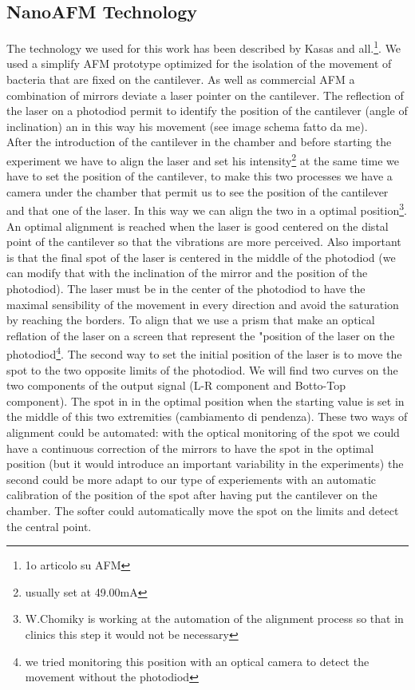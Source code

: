 \documentclass[11pt, a4paper]{article}
\begin{document}
\subsection{NanoAFM Technology}%
The technology we used for this work has been described by Kasas and all.\footnote{1o articolo su AFM}. We used a simplify AFM prototype optimized for the isolation of the movement of bacteria that are fixed on the cantilever. 
As well as commercial AFM a combination of mirrors deviate a laser pointer on the cantilever. The reflection of the laser on a photodiod permit to identify the position of the cantilever (angle of inclination) an in this way his movement (see image schema fatto da me).
\\After the introduction of the cantilever in the chamber and before starting the experiment we have to align the laser and set his intensity\footnote{usually set at 49.00mA} at the same time we have to set the position of the cantilever, to make this two processes we have a camera under the chamber that permit us to see the position of the cantilever and that one of the laser. In this way we can align the two in a optimal position\footnote{W.Chomiky is working at the automation of the alignment process so that in clinics this step it would not be necessary}. An optimal alignment is reached when the laser is good centered on the distal point of the cantilever so that the vibrations are more perceived. Also important is that the final spot of the laser is centered in the middle of the photodiod (we can modify that with the inclination of the mirror and the position of the photodiod). 
The laser must be in the center of the photodiod to have the maximal sensibility of the movement in every direction and avoid the saturation by reaching the borders. To align that we use a prism that make an optical reflation of the laser on a screen that represent the "position of the laser on the photodiod\footnote{we tried monitoring this position with an optical camera to detect the movement without the photodiod}. The second way to set the initial position of the laser is to move the spot to the two opposite limits of the photodiod. We will find two curves on the two components of the output signal (L-R component and Botto-Top component). The spot in in the optimal position when the starting value is set in the middle of this two extremities (cambiamento di pendenza).
These two ways of alignment could be automated: with the optical monitoring of the spot we could have a continuous correction of the mirrors to have the spot in the optimal position (but it would introduce an important variability in the experiments) the second could be more adapt to our type of experiements with an automatic calibration of the position of the spot after having put the cantilever on the chamber. The softer could automatically move the spot on the limits and detect the central point. 
\end{document}
